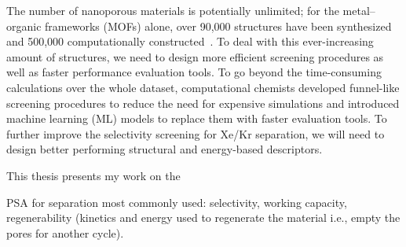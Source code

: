 The number of nanoporous materials is potentially unlimited; for the metal--organic frameworks (MOFs) alone, over 90,000 structures have been synthesized~\autocite{Groom_2016} and 500,000 computationally constructed~\autocite{Wilmer_2012,Boyd_2016,Colon_2017}. To deal with this ever-increasing amount of structures, we need to design more efficient screening procedures as well as faster performance evaluation tools. To go beyond the time-consuming calculations over the whole dataset, computational chemists developed funnel-like screening procedures to reduce the need for expensive simulations and introduced machine learning (ML) models to replace them with faster evaluation tools.\autocite{Ren_2022} To further improve the selectivity screening for Xe/Kr separation, we will need to design better performing structural and energy-based descriptors.



\begin{center}
\end{center}

This thesis presents my work on the 


PSA for separation most commonly used: selectivity, working capacity, regenerability (kinetics and energy used to regenerate the material i.e., empty the pores for another cycle).\autocite{Kumar_1994}

\vfill
\begin{center}
\end{center}
\vfill\vfill